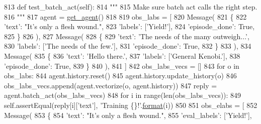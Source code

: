 \begin{DoxyCode}
813     \textcolor{keyword}{def }test\_batch\_act(self):
814         \textcolor{stringliteral}{"""}
815 \textcolor{stringliteral}{        Make sure batch act calls the right step.}
816 \textcolor{stringliteral}{        """}
817         agent = \hyperlink{namespacetests_1_1test__torch__agent_ae929d109305aaea29fbfa13ecf1f32e9}{get\_agent}()
818 
819         obs\_labs = [
820             Message(
821                 \{
822                     \textcolor{stringliteral}{'text'}: \textcolor{stringliteral}{"It's only a flesh wound."},
823                     \textcolor{stringliteral}{'labels'}: [\textcolor{stringliteral}{'Yield!'}],
824                     \textcolor{stringliteral}{'episode\_done'}: \textcolor{keyword}{True},
825                 \}
826             ),
827             Message(
828                 \{
829                     \textcolor{stringliteral}{'text'}: \textcolor{stringliteral}{'The needs of the many outweigh...'},
830                     \textcolor{stringliteral}{'labels'}: [\textcolor{stringliteral}{'The needs of the few.'}],
831                     \textcolor{stringliteral}{'episode\_done'}: \textcolor{keyword}{True},
832                 \}
833             ),
834             Message(
835                 \{
836                     \textcolor{stringliteral}{'text'}: \textcolor{stringliteral}{'Hello there.'},
837                     \textcolor{stringliteral}{'labels'}: [\textcolor{stringliteral}{'General Kenobi.'}],
838                     \textcolor{stringliteral}{'episode\_done'}: \textcolor{keyword}{True},
839                 \}
840             ),
841         ]
842         obs\_labs\_vecs = []
843         \textcolor{keywordflow}{for} o \textcolor{keywordflow}{in} obs\_labs:
844             agent.history.reset()
845             agent.history.update\_history(o)
846             obs\_labs\_vecs.append(agent.vectorize(o, agent.history))
847         reply = agent.batch\_act(obs\_labs\_vecs)
848         \textcolor{keywordflow}{for} i \textcolor{keywordflow}{in} range(len(obs\_labs\_vecs)):
849             self.assertEqual(reply[i][\textcolor{stringliteral}{'text'}], \textcolor{stringliteral}{'Training \{\}!'}.\hyperlink{namespaceparlai_1_1chat__service_1_1services_1_1messenger_1_1shared__utils_a32e2e2022b824fbaf80c747160b52a76}{format}(i))
850 
851         obs\_elabs = [
852             Message(
853                 \{
854                     \textcolor{stringliteral}{'text'}: \textcolor{stringliteral}{"It's only a flesh wound."},
855                     \textcolor{stringliteral}{'eval\_labels'}: [\textcolor{stringliteral}{'Yield!'}],

\end{DoxyCode}
